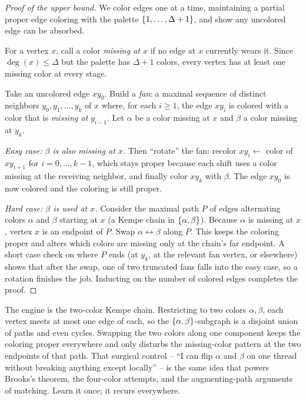 \begin{proof}[Proof of the upper bound]
We color edges one at a time, maintaining a partial proper edge coloring with the
palette $\{1,\dots,\Delta+1\}$, and show any uncolored edge can be absorbed.

For a vertex $x$, call a color \emph{missing at $x$} if no edge at $x$ currently
wears it. Since $\deg(x)\le\Delta$ but the palette has $\Delta+1$ colors, every
vertex has at least one missing color at every stage.

Take an uncolored edge $xy_0$. Build a \emph{fan}: a maximal sequence of distinct
neighbors $y_0,y_1,\dots,y_k$ of $x$ where, for each $i\ge1$, the edge $xy_i$ is
colored with a color that is \emph{missing at} $y_{i-1}$. Let $\alpha$ be a color
missing at $x$ and $\beta$ a color missing at $y_k$.

\emph{Easy case: $\beta$ is also missing at $x$.} Then ``rotate'' the fan: recolor
$xy_i \leftarrow$ color of $xy_{i+1}$ for $i=0,\dots,k-1$, which stays proper because
each shift uses a color missing at the receiving neighbor, and finally color
$xy_k$ with $\beta$. The edge $xy_0$ is now colored and the coloring is still proper.

\emph{Hard case: $\beta$ is used at $x$.} Consider the maximal path $P$ of edges
alternating colors $\alpha$ and $\beta$ starting at $x$ (a Kempe chain in
$\{\alpha,\beta\}$). Because $\alpha$ is missing at $x$, vertex $x$ is an endpoint
of $P$. Swap $\alpha\leftrightarrow\beta$ along $P$. This keeps the coloring proper
and alters which colors are missing only at the chain's far endpoint. A short case
check on where $P$ ends (at $y_k$, at the relevant fan vertex, or elsewhere) shows
that after the swap, one of two truncated fans falls into the easy case, so a
rotation finishes the job. Inducting on the number of colored edges completes the
proof.
\end{proof}

\begin{whybox}
The engine is the two-color Kempe chain. Restricting to two colors $\alpha,\beta$,
each vertex meets at most one edge of each, so the $\{\alpha,\beta\}$-subgraph is
a disjoint union of paths and even cycles. Swapping the two colors along one
component keeps the coloring proper everywhere and only disturbs the missing-color
pattern at the two endpoints of that path. That surgical control -- ``I can flip
$\alpha$ and $\beta$ on one thread without breaking anything except locally'' -- is
the same idea that powers Brooks's theorem, the four-color attempts, and the
augmenting-path arguments of matching. Learn it once; it recurs everywhere.
\end{whybox}

